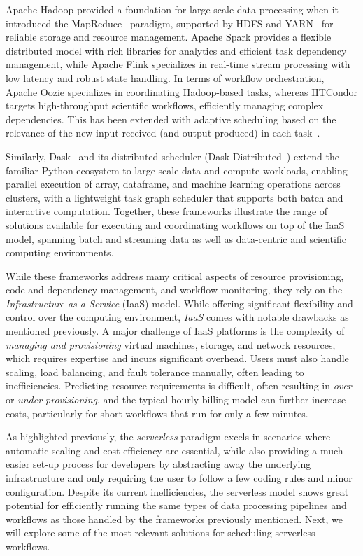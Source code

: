 Apache Hadoop provided a foundation for large-scale data processing when it introduced the MapReduce~\cite{mapreduce} paradigm, supported by HDFS and YARN~\cite{yarn} for reliable storage and resource management. Apache Spark provides a flexible distributed model with rich libraries for analytics and efficient task dependency management, while Apache Flink specializes in real-time stream processing with low latency and robust state handling. In terms of workflow orchestration, Apache Oozie specializes in coordinating Hadoop-based tasks, whereas HTCondor targets high-throughput scientific workflows, efficiently managing complex dependencies. This has been extended with adaptive scheduling based on the relevance of the new input received (and output produced) in each task~\cite{compj-16, middleware-18}.

Similarly, Dask~\cite{dask_python} and its distributed scheduler (Dask Distributed~\cite{dask_python_distributed}) extend the familiar Python ecosystem to large-scale data and compute workloads, enabling parallel execution of array, dataframe, and machine learning operations across clusters, with a lightweight task graph scheduler that supports both batch and interactive computation. Together, these frameworks illustrate the range of solutions available for executing and coordinating workflows on top of the IaaS model, spanning batch and streaming data as well as data-centric and scientific computing environments.

While these frameworks address many critical aspects of resource provisioning, code and dependency management, and workflow monitoring, they rely on the \textit{Infrastructure as a Service} (IaaS) model. While offering significant flexibility and control over the computing environment, \textit{IaaS} comes with notable drawbacks as mentioned previously. A major challenge of IaaS platforms is the complexity of \textit{managing and provisioning} virtual machines, storage, and network resources, which requires expertise and incurs significant overhead. Users must also handle scaling, load balancing, and fault tolerance manually, often leading to inefficiencies. Predicting resource requirements is difficult, often resulting in \textit{over-} or \textit{under-provisioning}, and the typical hourly billing model can further increase costs, particularly for short workflows that run for only a few minutes.

As highlighted previously, the \textit{serverless} paradigm excels in scenarios where automatic scaling and cost-efficiency are essential, while also providing a much easier set-up process for developers by abstracting away the underlying infrastructure and only requiring the user to follow a few coding rules and minor configuration. Despite its current inefficiencies, the serverless model shows great potential for efficiently running the same types of data processing pipelines and workflows as those handled by the frameworks previously mentioned. Next, we will explore some of the most relevant solutions for scheduling serverless workflows.

